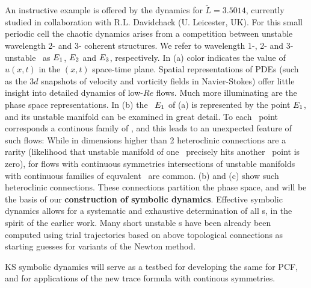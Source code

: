 An instructive 
example is offered by the dynamics for $\tilde{L}=3.5014$, %
currently studied in collaboration with
R.L. Davidchack (U. Leicester, UK).
For this small periodic cell
the chaotic dynamics arises from
a competition between unstable
wavelength 2- and 3- coherent structures.
We refer to wavelength 1-, 2- and 3- unstable \eqva\ as
$E_{1}$, $E_{2}$ and $E_{3}$,
respectively.
In  (a)
color indicates the value of $u(x,t)$ in 
the $(x,t)$ space-time plane.
Spatial representations of
PDEs (such as the 3$d$
snapshots of velocity and vorticity fields in Navier-Stokes)
offer little insight into detailed dynamics of low-$Re$ flows.
Much more illuminating are the phase space representations.
In  (b) the \eqv\ $E_{1}$ of
 (a) is represented by the point $E_{1}$,
and its unstable manifold can be examined in great detail.
To each \eqv\ point corresponds a continous family
of \eqva, and this leads to an unexpected feature of such
flows: While in dimensions higher than 2 heteroclinic connections 
are a rarity (likelihood that unstable manifold of one
 \eqv\ precisely hits another \eqv\ point is zero), 
for flows with continuous symmetries intersections of unstable
manifolds with continuous families of equvalent \eqva\ are common.
 (b) and (c) show 
such heteroclinic connections.
These connections partition the phase space,
and will be the basis of our
{\bf construction of symbolic dynamics}.
Effective symbolic dynamics allows
for a systematic and exhaustive determination 
of all \rpo s, in the spirit of 
the earlier work. 
Many short unstable \rpo s have been already 
been computed using trial trajectories based on above
topological connections as starting  guesses 
for variants of the Newton method.

KS symbolic dynamics will
serve as a testbed for developing the
same for PCF, and for applications of the new
trace formula with continous symmetries.

